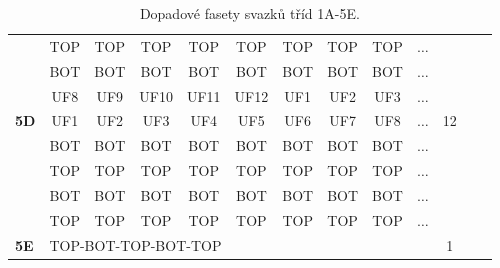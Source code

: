 \begin{table}[h!]
\begin{tabular}{|l|c|c|c|c|c|c|c|c|c|c|c|c|}
 & TOP & TOP & TOP & TOP & TOP & TOP & TOP & TOP & $\dots$ & \\
 & BOT & BOT & BOT & BOT & BOT & BOT & BOT & BOT & $\dots$ & \\
 & UF8 & UF9 & UF10 & UF11 & UF12 & UF1 & UF2 & UF3 & $\dots$ & \\
\hline \hline
\textbf{5D} & UF1 & UF2 & UF3 & UF4 & UF5 & UF6 & UF7 & UF8 & $\dots$ & 12\\
 & BOT & BOT & BOT & BOT & BOT & BOT & BOT & BOT & $\dots$ & \\
 & TOP & TOP & TOP & TOP & TOP & TOP & TOP & TOP & $\dots$ & \\
 & BOT & BOT & BOT & BOT & BOT & BOT & BOT & BOT & $\dots$ & \\
 & TOP & TOP & TOP & TOP & TOP & TOP & TOP & TOP & $\dots$ & \\
\hline \hline
\textbf{5E} & \multicolumn{9}{l}{TOP-BOT-TOP-BOT-TOP} \vline  & 1\\
\hline 
\end{tabular}
\caption{Dopadové fasety svazků tříd 1A-5E.}
\label{table:TableClasses1}
\end{table}




